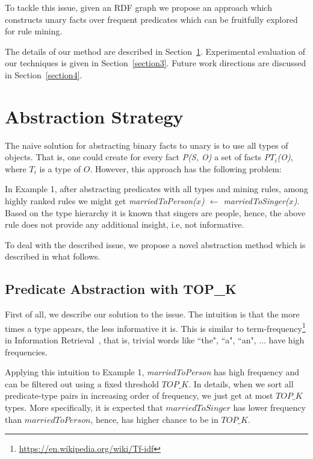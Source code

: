 \documentclass{acm_proc_article-sp}
\begin{document}
To tackle this issue, given an RDF graph we propose an approach which constructs unary facts over frequent predicates which can be fruitfully explored for rule mining.

The details of our method are described in Section~\ref{section2}. Experimental evaluation of our techniques is given in Section~\ref{section3}. Future work directions are discussed in Section~\ref{section4}.

\section{Abstraction Strategy}
\label{section2}

The naive solution for abstracting binary facts to unary is to use all types of objects. That is, one could create for every fact \textit{P(S, O)} a set of facts \textit{P$T_{i}$(O)}, where \textit{$T_{i}$} is a type of $O$. However, this approach has the following problem:

In Example 1, after abstracting predicates with all types and mining rules, among highly ranked rules we might get \textit{marriedToPerson($x$) $\leftarrow$ marriedToSinger($x$)}. Based on the type hierarchy it is known that singers are people, hence, the above rule does not provide any additional insight, i.e, not informative.


To deal with the described issue, we propose a novel abstraction method which is described in what follows.

\subsection{Predicate Abstraction with TOP\_K}
\label{section21}

First of all, we describe our solution to the issue. The intuition is that the more times a type appears, the less informative it is. This is similar to term-frequency\footnote{\url{https://en.wikipedia.org/wiki/Tf-idf}} in Information Retrieval~\cite{ref2}, that is, trivial words like ``the", ``a", ``an", ... have high frequencies.

Applying this intuition to Example 1, \textit{marriedToPerson} has high frequency and can be filtered out using a fixed threshold $TOP\_K$. In details, when we sort all predicate-type pairs in increasing order of frequency, we just get at most $TOP\_K$ types. More specifically, it is expected that $marriedToSinger$ has lower frequency than $marriedToPerson$, hence, has higher chance to be in $TOP\_K$.
\end{document}
